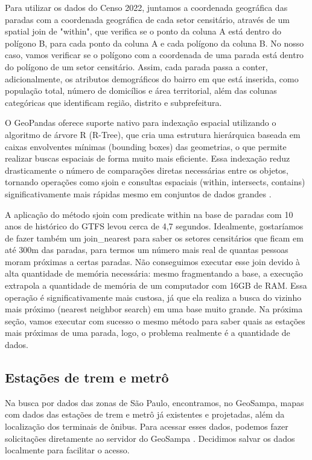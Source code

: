 Para utilizar os dados do Censo 2022, juntamos a coordenada geográfica das paradas com a coordenada geográfica de cada setor censitário, através de um spatial join de "within", que verifica se o ponto da coluna A está dentro do polígono B, para cada ponto da coluna A e cada polígono da coluna B. No nosso caso, vamos verificar se o polígono com a coordenada de uma parada está dentro do polígono de um setor censitário. Assim, cada parada passa a conter, adicionalmente, os atributos demográficos do bairro em que está inserida, como população total, número de domicílios e área territorial, além das colunas categóricas que identificam região, distrito e subprefeitura.  

O GeoPandas oferece suporte nativo para indexação espacial utilizando o algoritmo de árvore R (R-Tree), que cria uma estrutura hierárquica baseada em caixas envolventes mínimas (bounding boxes) das geometrias, o que permite realizar buscas espaciais de forma muito mais eficiente. Essa indexação reduz drasticamente o número de comparações diretas necessárias entre os objetos, tornando operações como sjoin e consultas espaciais (within, intersects, contains) significativamente mais rápidas mesmo em conjuntos de dados grandes \citep{geopandas}. 

A aplicação do método sjoin com predicate within na base de paradas com 10 anos de histórico do GTFS levou cerca de 4,7 segundos. Idealmente, gostaríamos de fazer também um join\_nearest para saber os setores censitários que ficam em até 300m das paradas, para termos um número mais real de quantas pessoas moram próximas a certas paradas. Não conseguimos executar esse join devido à alta quantidade de memória necessária: mesmo fragmentando a base, a execução extrapola a quantidade de memória de um computador com 16GB de RAM. Essa operação é significativamente mais custosa, já que ela realiza a busca do vizinho mais próximo (nearest neighbor search) em uma base muito grande. Na próxima seção, vamos executar com sucesso o mesmo método para saber quais as estações mais próximas de uma parada, logo, o problema realmente é a quantidade de dados.

\subsection{Estações de trem e metrô}\label{sec:trem_metro}

Na busca por dados das zonas de São Paulo, encontramos, no GeoSampa, mapas com dados das estações de trem e metrô já existentes e projetadas, além da localização dos terminais de ônibus. Para acessar esses dados, podemos fazer solicitações diretamente ao servidor do GeoSampa \citep{prefeituraSPPDE}. Decidimos salvar os dados localmente para facilitar o acesso.

